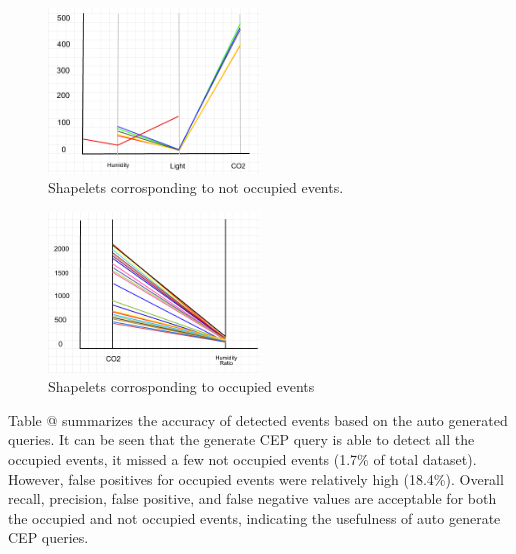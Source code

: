 \documentclass[conference]{IEEEtran}  %
\makeatletter
\newcommand*{\rom}[1]{\expandafter\@slowromancap\romannumeral #1@}
\makeatother
\begin{document}
\begin{figure}
\includegraphics[width=0.5\textwidth]{Occupancy_event1.png}
\caption{Shapelets corrosponding to not occupied events.}
\label{fig:occupancyEvent1}
\squeezeup\squeezeup
\end{figure}

\begin{figure}
\includegraphics[width=0.5\textwidth]{Occupancy_event2.png}
\caption{Shapelets corrosponding to occupied events}
\label{fig:occupancyEvent2}
\squeezeup\squeezeup
\end{figure}


Table \rom{1} summarizes the accuracy of detected events based on the auto generated queries. It can be seen that the generate CEP query is able to detect all the occupied events, it missed a few not occupied events (1.7\% of total dataset). However, false positives for occupied events were relatively high (18.4\%). Overall recall, precision, false positive, and false negative values are acceptable for both the occupied and not occupied events, indicating the usefulness of auto generate CEP queries. 
\end{document}
